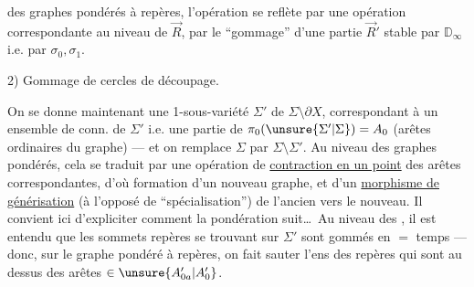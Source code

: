 
des graphes pondérés à repères, l'opération 
se reflète par une opération correspondante au niveau de $\vec R$, par le ``gommage'' d'une partie $\vec R'$ stable par $\mathbb D_\infty$ i.e. par $\sigma_0,\sigma_1$.

2) Gommage de cercles de découpage.

On se donne maintenant une  1-sous-variété
  $\Sigma'$ de $\Sigma\setminus\partial X$,
correspondant à un ensemble  de  conn. de $\Sigma'$ i.e. une partie  de $\pi_0(\unsure{\Sigma'|\Sigma})=A_0$
(arêtes ordinaires du graphe) --- et on remplace $\Sigma$ par $\Sigma\setminus\Sigma'$.
Au niveau des graphes pondérés, cela se traduit par une opération de \uline{contraction en un point} des arêtes correspondantes, d'où formation d'un nouveau graphe, et d'un \uline{morphisme de générisation} (à l'opposé de ``spécialisation'') de l'ancien vers le nouveau.
Il convient ici d'expliciter comment la pondération suit\ldots\
Au niveau des  , il est entendu que les sommets repères se trouvant sur $\Sigma'$ sont gommés en $=$ temps --- donc, sur le graphe pondéré à repères, on fait sauter l'ens des repères qui sont au dessus des arêtes $\in\unsure{A'_{0a}|A'_0}$.
\mspage{53}

